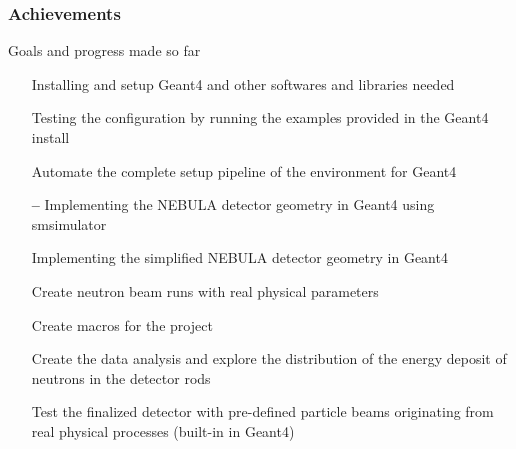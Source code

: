 \begin{frame}
\frametitle{Achievements}

\begin{block}{Goals and progress made so far}
	\begin{itemize}
		\item[{\color{PineGreen} \checkmark}] Installing and setup Geant4 and other softwares and libraries needed
		\item[{\color{PineGreen} \checkmark}] Testing the configuration by running the examples provided in the Geant4 install
		\item[{\color{PineGreen} \checkmark}] Automate the complete setup pipeline of the environment for Geant4
		\item[{\color{red} \textbf{--}}] Implementing the NEBULA detector geometry in Geant4 using smsimulator
		\item[{\color{PineGreen} \checkmark}] Implementing the simplified NEBULA detector geometry in Geant4
		\item[{\color{PineGreen} \checkmark}] Create neutron beam runs with real physical parameters
		\item[{\color{PineGreen} \checkmark}] Create macros for the project
		\item[{\color{PineGreen} \checkmark}] Create the data analysis and explore the distribution of the energy deposit of neutrons in the detector rods
		\item[{\color{PineGreen} \checkmark}] Test the finalized detector with pre-defined particle beams originating from real physical processes (built-in in Geant4)
	\end{itemize}
\end{block}

\end{frame}